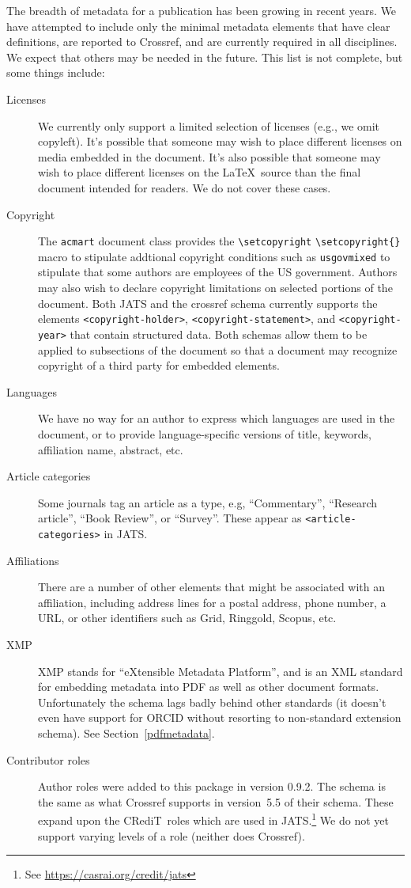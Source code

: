 \documentclass{article}
\newcommand\CREDIT{CRediT}
\newcommand{\cmd}[2][]{%
  \def\FirstArg{#1}%
  \ifx\FirstArg\empty%
    \texttt{\textbackslash{}#2}%
  \else%
    \texttt{\textbackslash{}#2\{#1\}}%
  \fi
}
\begin{document}
The breadth of metadata for a publication has been growing in recent
years.  We have attempted to include only the minimal metadata
elements that have clear definitions, are reported to Crossref, and
are currently required in all disciplines.  We expect that
others may be needed in the future. This list is not complete, but
some things include:
\begin{description}
\item[Licenses] We currently only support a limited selection of licenses (e.g., we omit
copyleft). It's possible that someone may wish to place different licenses on media embedded
in the document. It's also possible that someone may wish to place different licenses on the \LaTeX\ source
than the final document intended for readers. We do not cover these cases.
\item[Copyright] The \texttt{acmart} document class provides the \cmd{setcopyright} macro to stipulate
addtional copyright conditions such as \texttt{usgovmixed} to
stipulate that some authors are employees of the US
government. Authors may also wish to declare copyright limitations on
selected portions of the document. Both JATS and the crossref schema currently supports the elements
\texttt{\textless{copyright-holder}\textgreater},
\texttt{\textless{copyright-statement}\textgreater}, and
\texttt{\textless{copyright-year}\textgreater} that contain structured data. Both schemas allow
them to be applied to subsections of the document so that a document may recognize copyright
of a third party for embedded elements.
\item[Languages] We have no way for an author to express which languages are used in the document,
or to provide language-specific versions of title, keywords, affiliation name, abstract, etc.
\item[Article categories] Some journals tag an article as a type, e.g, ``Commentary'', ``Research article'',
``Book Review'', or ``Survey''. These appear as \texttt{\textless{article-categories}\textgreater} in JATS.
\item[Affiliations] There are a number of other elements that might be associated with an affiliation,
including address lines for a postal address, phone number, a URL, or other identifiers such as
Grid, Ringgold, Scopus, etc.

\item[XMP] XMP stands for ``eXtensible Metadata Platform'', and is an XML standard for
embedding metadata into PDF as well as other document
formats. Unfortunately the schema lags badly behind other standards
(it doesn't even have support for ORCID without resorting to
non-standard extension schema). See Section~\ref{pdfmetadata}.
\item[Contributor roles] \label{rolestodo} Author roles were
added to this package in version 0.9.2. The schema is the same
as what Crossref supports in version~5.5 of their schema. These expand
upon the \CREDIT\ roles which are used in JATS.\footnote{See \url{https://casrai.org/credit/jats}}
We do not yet support varying levels of a role (neither does Crossref).


\end{description}
\end{document}
